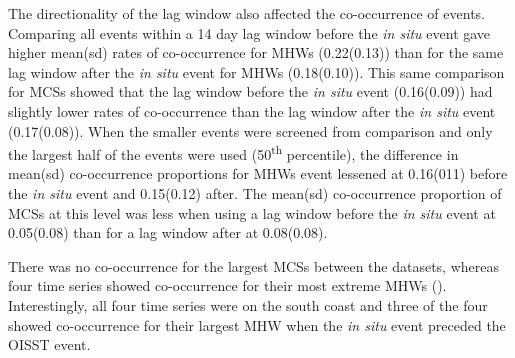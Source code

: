\documentclass[a4paper,10pt,review]{elsarticle}
\begin{document}
The directionality of the lag window also affected the co-occurrence of events. Comparing all events within a 14 day lag window before the \emph{in situ} event gave higher mean(sd) rates of co-occurrence for MHWs (0.22(0.13)) than for the same lag window after the \emph{in situ} event for MHWs (0.18(0.10)). This same comparison for MCSs showed that the lag window before the \emph{in situ} event (0.16(0.09)) had slightly lower rates of co-occurrence than the lag window after the \emph{in situ} event (0.17(0.08)). When the smaller events were screened from comparison and only the largest half of the events were used (50\textsuperscript{th} percentile), the difference in mean(sd) co-occurrence proportions for MHWs event lessened at 0.16(011) before the \emph{in situ} event and 0.15(0.12) after. The mean(sd) co-occurrence proportion of MCSs at this level was less when using a lag window before the \emph{in situ} event at 0.05(0.08) than for a lag window after at 0.08(0.08).

There was no co-occurrence for the largest MCSs between the datasets, whereas four time series showed co-occurrence for their most extreme MHWs (). Interestingly, all four time series were on the south coast and three of the four showed co-occurrence for their largest MHW when the \emph{in situ} event preceded the OISST event.
\end{document}
